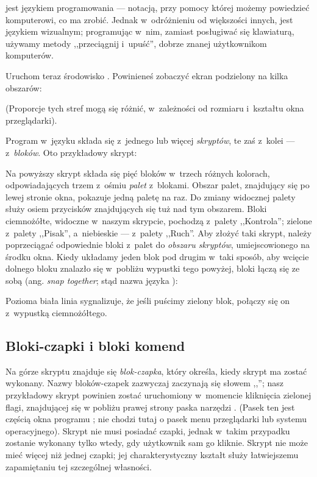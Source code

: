 \documentclass{report}
\begin{document}
\Snap{} jest językiem programowania --- notacją, przy pomocy której możemy powiedzieć komputerowi, co ma zrobić. Jednak w~odróżnieniu od większości innych, \Snap{} jest językiem wizualnym; programując w~nim, zamiast posługiwać się klawiaturą, używamy metody ,,przeciągnij i~upuść'', dobrze znanej użytkownikom komputerów.

Uruchom teraz środowisko \Snap{}. Powinieneś zobaczyć ekran podzielony na kilka obszarów:

\begin{center}
\def\svgwidth{\textwidth}

\end{center}

(Proporcje tych stref mogą się różnić, w~zależności od rozmiaru i~kształtu okna przeglądarki).

Program w~języku \Snap{} składa się z~jednego lub więcej \emph{skryptów}, te zaś z~kolei --- z~\emph{bloków}. Oto przykładowy skrypt:

\label{fig:typowy-skrypt}

Na powyższy skrypt składa się pięć bloków w~trzech różnych kolorach, odpowiadających trzem z~ośmiu \emph{palet} z~blokami. Obszar palet, znajdujący się po lewej stronie okna, pokazuje jedną paletę na raz. Do zmiany widocznej palety służy osiem przycisków znajdujących się tuż nad tym obszarem. Bloki ciemnożółte, widoczne w~naszym skrypcie, pochodzą z~palety ,,Kontrola''; zielone z~palety ,,Pisak'', a~niebieskie --- z~palety ,,Ruch''. Aby złożyć taki skrypt, należy poprzeciągać odpowiednie bloki z~palet do \emph{obszaru skryptów}, umiejscowionego na środku okna. Kiedy układamy jeden blok pod drugim w~taki sposób, aby wcięcie dolnego bloku znalazło się w~pobliżu wypustki tego powyżej, bloki łączą się ze sobą (ang. \textit{snap together}; stąd nazwa języka \Snap{}):


Pozioma biała linia sygnalizuje, że jeśli puścimy zielony blok, połączy się on z~wypustką ciemnożółtego.

\subsection{Bloki-czapki i bloki komend}

Na górze skryptu znajduje się \emph{blok-czapka}, który określa, kiedy skrypt ma zostać wykonany. Nazwy bloków-czapek zazwyczaj zaczynają się słowem ,,''; nasz przykładowy skrypt powinien zostać uruchomiony w~momencie kliknięcia zielonej flagi, znajdującej się w pobliżu prawej strony paska narzędzi . (Pasek ten jest częścią okna programu \Snap{}; nie chodzi tutaj o pasek menu przeglądarki lub systemu operacyjnego). Skrypt nie musi posiadać czapki, jednak w~takim przypadku zostanie wykonany tylko wtedy, gdy użytkownik sam go kliknie. Skrypt nie może mieć więcej niż jednej czapki; jej charakterystyczny kształt służy łatwiejszemu zapamiętaniu tej szczególnej własności.
\end{document}
